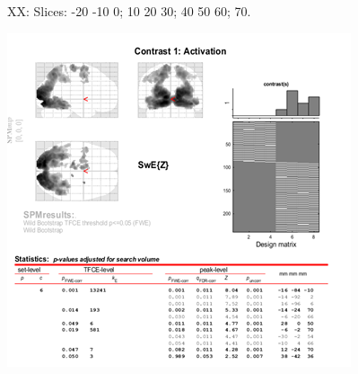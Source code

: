 \documentclass[a4paper,fleqn]{cas-sc}
\begin{document}
\begin{figure}[ht]
\begin{minipage}{0.48\textwidth}
         \label{fig:b}
    \end{minipage}
    \caption{XX: Slices: -20 -10 0; 10 20 30; 40 50 60; 70. }
    \label{fig:YA_slice}
\end{figure}



\begin{figure}[ht]
    \centering
    \begin{minipage}{0.48\textwidth}
        \centering
        \includegraphics[clip, trim=0 0 0 0, width=\linewidth]{figs/OA_spm.png} %
         \label{fig:a}
    \end{minipage}
    \begin{minipage}{0.48\textwidth}
        \centering

\end{minipage}
\end{figure}
\end{document}
